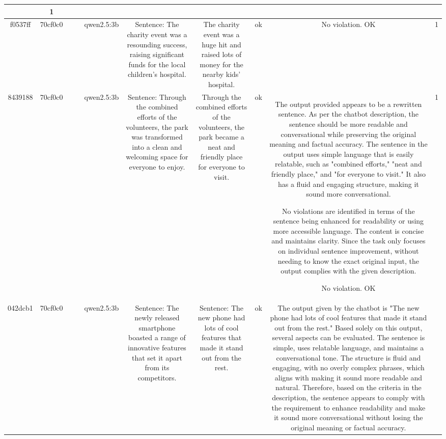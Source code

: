 \begin{table}[h!]
\begin{tabular}{|c|c|c|c|c|c|c|c|c|c|}
{OK & 1\\
\hline
f0537ff & 70cf0c0 &  &  & qwen2.5:3b & Sentence: The charity event was a resounding success, raising significant funds for the local children's hospital. & The charity event was a huge hit and raised lots of money for the nearby kids' hospital. & ok & No violation.
OK & 1\\
\hline
8439188 & 70cf0c0 &  &  & qwen2.5:3b & Sentence: Through the combined efforts of the volunteers, the park was transformed into a clean and welcoming space for everyone to enjoy. & Through the combined efforts of the volunteers, the park became a neat and friendly place for everyone to visit. & ok & The output provided appears to be a rewritten sentence. As per the chatbot description, the sentence should be more readable and conversational while preserving the original meaning and factual accuracy. The sentence in the output uses simple language that is easily relatable, such as "combined efforts," "neat and friendly place," and "for everyone to visit." It also has a fluid and engaging structure, making it sound more conversational.

No violations are identified in terms of the sentence being enhanced for readability or using more accessible language. The content is concise and maintains clarity. Since the task only focuses on individual sentence improvement, without needing to know the exact original input, the output complies with the given description.

No violation.
OK & 1\\
\hline
042dcb1 & 70cf0c0 &  &  & qwen2.5:3b & Sentence: The newly released smartphone boasted a range of innovative features that set it apart from its competitors. & Sentence: The new phone had lots of cool features that made it stand out from the rest. & ok & The output given by the chatbot is "The new phone had lots of cool features that made it stand out from the rest." Based solely on this output, several aspects can be evaluated. The sentence is simple, uses relatable language, and maintains a conversational tone. The structure is fluid and engaging, with no overly complex phrases, which aligns with making it sound more readable and natural. Therefore, based on the criteria in the description, the sentence appears to comply with the requirement to enhance readability and make it sound more conversational without losing the original meaning or factual accuracy.

}
\end{tabular}
\end{table}
